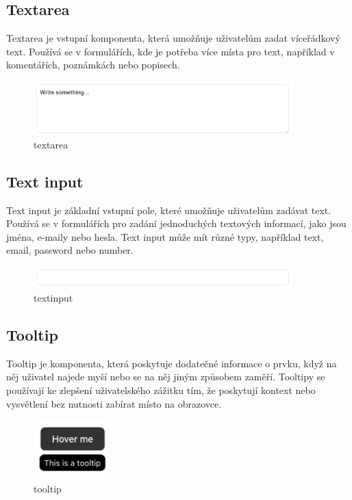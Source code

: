 \subsection{Textarea}
Textarea je vstupní komponenta, která umožňuje uživatelům zadat víceřádkový text. Používá se v formulářích, kde je potřeba více místa pro text, například v komentářích, poznámkách nebo popisech.

\begin{figure}[H]
  \centering
  \includegraphics[width=10cm]{images/textarea}
  \captionsetup{justification=centering,margin=2cm}
  \caption{textarea} \label{picture:textarea}
\end{figure}

\subsection{Text input}
Text input je základní vstupní pole, které umožňuje uživatelům zadávat text. Používá se v formulářích pro zadání jednoduchých textových informací, jako jsou jména, e-maily nebo hesla. Text input může mít různé typy, například text, email, password nebo number.

\begin{figure}[H]
  \centering
  \includegraphics[width=10cm]{images/textinput}
  \captionsetup{justification=centering,margin=2cm}
  \caption{textinput} \label{picture:textinput}
\end{figure}

\subsection{Tooltip}
Tooltip je komponenta, která poskytuje dodatečné informace o prvku, když na něj uživatel najede myší nebo se na něj jiným způsobem zaměří. Tooltipy se používají ke zlepšení uživatelského zážitku tím, že poskytují kontext nebo vysvětlení bez nutnosti zabírat místo na obrazovce.

\begin{figure}[H]
  \centering
  \includegraphics[width=3cm]{images/tooltip}
  \captionsetup{justification=centering,margin=2cm}
  \caption{tooltip} \label{picture:tooltip}
\end{figure}

